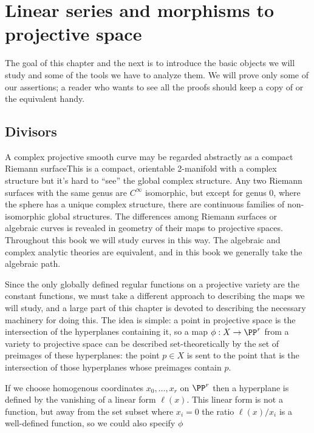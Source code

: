 

\chapter{Linear series and morphisms to projective space}\label{linear series}

The goal of this chapter and the next is to introduce the basic objects we will study and some of the tools we have to analyze them. We will prove only some of our assertions; a reader who wants to see all the proofs should keep a copy of \cite{Hartshorne1977} or the equivalent handy.

\section{Divisors}

A complex projective smooth curve may  be regarded abstractly as a compact Riemann surfaceThis is a compact, orientable 2-manifold with a complex structure but it's hard to ``see'' the global complex structure. Any two Riemann surfaces with the same genus are $C^\infty$ isomorphic, but except for genus 0, where the sphere has a unique complex structure,
there are continuous families of non-isomorphic global structures.  The differences among Riemann surfaces or algebraic curves is revealed in  geometry of their maps to projective spaces. Throughout this book we will study curves in this way. The algebraic and
complex analytic theories are equivalent, and in this book we generally take the algebraic path.

Since the only  globally defined regular functions on a projective variety are the constant functions, we must take a different approach to describing the maps we will study, and a large part of this chapter is devoted to describing the necessary machinery for doing this. The idea is simple: a point in projective space is the intersection of the hyperplanes containing it, so a map $\phi: X\to \PP^r$ from a variety to projective space can be described set-theoretically
by the set of preimages of these hyperplanes: the point $p\in X$ is sent to the point
that is the intersection of those hyperplanes whose preimages contain $p$.

If we choose homogenous coordinates $x_0,\dots, x_r$ on $\PP^r$ then a hyperplane
is defined by the vanishing of a linear form $\ell(x)$. This linear form is not a function, but
away from the set subset where $x_i=0$ the ratio $\ell(x)/x_i$ is a well-defined function,
so we could also specify $\phi$

